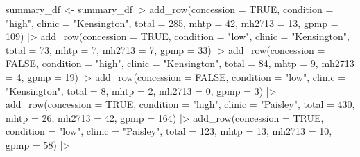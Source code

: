 \documentclass[
  letterpaper,
  DIV=11,
  numbers=noendperiod,
  oneside]{scrartcl}
\newenvironment{Shaded}{\begin{snugshade}}{\end{snugshade}}
\newcommand{\AttributeTok}[1]{\textcolor[rgb]{0.40,0.45,0.13}{#1}}
\newcommand{\ConstantTok}[1]{\textcolor[rgb]{0.56,0.35,0.01}{#1}}
\newcommand{\DecValTok}[1]{\textcolor[rgb]{0.68,0.00,0.00}{#1}}
\newcommand{\FunctionTok}[1]{\textcolor[rgb]{0.28,0.35,0.67}{#1}}
\newcommand{\NormalTok}[1]{\textcolor[rgb]{0.00,0.23,0.31}{#1}}
\newcommand{\OtherTok}[1]{\textcolor[rgb]{0.00,0.23,0.31}{#1}}
\newcommand{\SpecialCharTok}[1]{\textcolor[rgb]{0.37,0.37,0.37}{#1}}
\newcommand{\StringTok}[1]{\textcolor[rgb]{0.13,0.47,0.30}{#1}}
\begin{document}
\begin{Shaded}
\begin{Highlighting}[]
\NormalTok{summary\_df }\OtherTok{\textless{}{-}}\NormalTok{ summary\_df }\SpecialCharTok{|\textgreater{}}
  \FunctionTok{add\_row}\NormalTok{(}\AttributeTok{concession =} \ConstantTok{TRUE}\NormalTok{, }\AttributeTok{condition =} \StringTok{"high"}\NormalTok{, }\AttributeTok{clinic =} \StringTok{"Kensington"}\NormalTok{, }\AttributeTok{total =} \DecValTok{285}\NormalTok{, }\AttributeTok{mhtp =} \DecValTok{42}\NormalTok{, }\AttributeTok{mh2713 =} \DecValTok{13}\NormalTok{, }\AttributeTok{gpmp =} \DecValTok{109}\NormalTok{) }\SpecialCharTok{|\textgreater{}}
  \FunctionTok{add\_row}\NormalTok{(}\AttributeTok{concession =} \ConstantTok{TRUE}\NormalTok{, }\AttributeTok{condition =} \StringTok{"low"}\NormalTok{, }\AttributeTok{clinic =} \StringTok{"Kensington"}\NormalTok{, }\AttributeTok{total =} \DecValTok{73}\NormalTok{, }\AttributeTok{mhtp =} \DecValTok{7}\NormalTok{, }\AttributeTok{mh2713 =} \DecValTok{7}\NormalTok{, }\AttributeTok{gpmp =} \DecValTok{33}\NormalTok{) }\SpecialCharTok{|\textgreater{}}
  \FunctionTok{add\_row}\NormalTok{(}\AttributeTok{concession =} \ConstantTok{FALSE}\NormalTok{, }\AttributeTok{condition =} \StringTok{"high"}\NormalTok{, }\AttributeTok{clinic =} \StringTok{"Kensington"}\NormalTok{, }\AttributeTok{total =} \DecValTok{84}\NormalTok{, }\AttributeTok{mhtp =} \DecValTok{9}\NormalTok{, }\AttributeTok{mh2713 =} \DecValTok{4}\NormalTok{, }\AttributeTok{gpmp =} \DecValTok{19}\NormalTok{) }\SpecialCharTok{|\textgreater{}}
  \FunctionTok{add\_row}\NormalTok{(}\AttributeTok{concession =} \ConstantTok{FALSE}\NormalTok{, }\AttributeTok{condition =} \StringTok{"low"}\NormalTok{, }\AttributeTok{clinic =} \StringTok{"Kensington"}\NormalTok{, }\AttributeTok{total =} \DecValTok{8}\NormalTok{, }\AttributeTok{mhtp =} \DecValTok{2}\NormalTok{, }\AttributeTok{mh2713 =} \DecValTok{0}\NormalTok{, }\AttributeTok{gpmp =} \DecValTok{3}\NormalTok{) }\SpecialCharTok{|\textgreater{}}
  \FunctionTok{add\_row}\NormalTok{(}\AttributeTok{concession =} \ConstantTok{TRUE}\NormalTok{, }\AttributeTok{condition =} \StringTok{"high"}\NormalTok{, }\AttributeTok{clinic =} \StringTok{"Paisley"}\NormalTok{, }\AttributeTok{total =} \DecValTok{430}\NormalTok{, }\AttributeTok{mhtp =} \DecValTok{26}\NormalTok{, }\AttributeTok{mh2713 =} \DecValTok{42}\NormalTok{, }\AttributeTok{gpmp =} \DecValTok{164}\NormalTok{) }\SpecialCharTok{|\textgreater{}}
  \FunctionTok{add\_row}\NormalTok{(}\AttributeTok{concession =} \ConstantTok{TRUE}\NormalTok{, }\AttributeTok{condition =} \StringTok{"low"}\NormalTok{, }\AttributeTok{clinic =} \StringTok{"Paisley"}\NormalTok{, }\AttributeTok{total =} \DecValTok{123}\NormalTok{, }\AttributeTok{mhtp =} \DecValTok{13}\NormalTok{, }\AttributeTok{mh2713 =} \DecValTok{10}\NormalTok{, }\AttributeTok{gpmp =} \DecValTok{58}\NormalTok{) }\SpecialCharTok{|\textgreater{}}

\end{Highlighting}
\end{Shaded}
\end{document}
